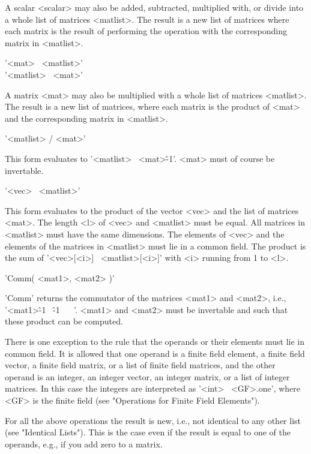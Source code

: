 A scalar <scalar>  may also  be added,  subtracted,  multiplied with,  or
divide into a whole list of matrices <matlist>.  The result is a new list
of matrices where each  matrix is the result  of performing the operation
with the corresponding matrix in <matlist>.

'<mat> \*\ <matlist>' \\
'<matlist> \*\ <mat>'

A  matrix  <mat>  may  also be multiplied  with a whole list  of matrices
<matlist>.  The  result  is a new list of matrices, where each matrix  is
the product of <mat> and the corresponding matrix in <matlist>.

'<matlist> / <mat>'

This form evaluates to  '<matlist> \*\ <mat>\^-1'.  <mat>  must of course
be invertable.

'<vec> \*\ <matlist>'

This form evaluates to  the product  of the vector <vec> and the  list of
matrices  <mat>.  The length  <l> of  <vec> and <matlist> must be  equal.
All matrices in <matlist> must have the same dimensions.  The elements of
<vec> and the elements of the matrices in <matlist> must lie in a  common
field.   The product  is the sum of '<vec>[<i>] \*\  <matlist>[<i>]' with
<i> running from 1 to <l>.

'Comm( <mat1>, <mat2> )'

'Comm' returns the  commutator of  the matrices <mat1> and  <mat2>, i.e.,
'<mat1>\^-1  \*\ <mat2>\^-1  \*\ <mat1>  \*\  <mat2>'.  <mat1> and <mat2>
must be invertable and such that these product can be computed.

There is  one exception to  the rule that  the operands or their elements
must  lie in common field.  It is allowed  that  one operand is  a finite
field element, a finite field vector, a finite field matrix, or a list of
finite  field  matrices, and the other operand  is an integer, an integer
vector, an integer matrix,  or  a list of integer matrices.  In this case
the integers are interpreted  as  '<int> \*\ <GF>.one', where <GF> is the
finite field (see "Operations for Finite Field Elements").

For  all  the above operations the result  is new, i.e., not identical to
any other list  (see  "Identical Lists").  This is the  case  even if the
result is equal  to  one of  the  operands, e.g., if  you add zero  to  a
matrix.


